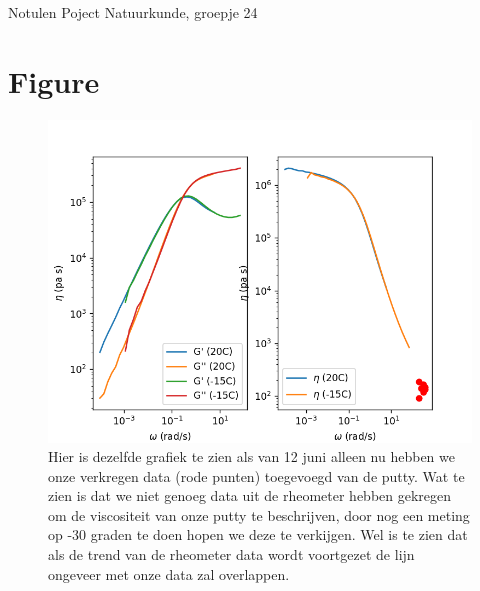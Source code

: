 \documentclass[11pt,a4paper]{article}
\begin{document}
\begin{Minutes}{Notulen Poject Natuurkunde, groepje 24}
\section{Figure}
\begin{figure}[h]
    \centering
    \includegraphics[width=0.5\linewidth]{Werkend.png}
    \caption{Hier is dezelfde grafiek te zien als van 12 juni alleen nu hebben we onze verkregen data (rode punten) toegevoegd van de putty. Wat te zien is dat we niet genoeg data uit de rheometer hebben gekregen om de viscositeit van onze putty te beschrijven, door nog een meting op -30 graden te doen hopen we deze te verkijgen. Wel is te zien dat als de trend van de rheometer data wordt voortgezet de lijn ongeveer met onze data zal overlappen.}
    \label{fig:enter-label}
\end{figure}

\end{Minutes}
\end{document}
